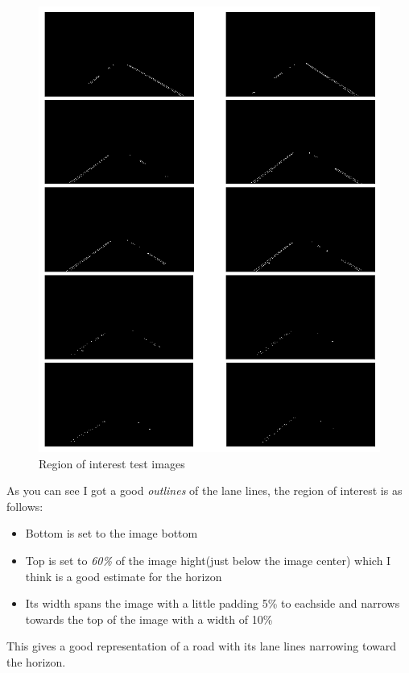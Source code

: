 \documentclass[11pt]{article}
\makeatletter
\def\maxwidth{\ifdim\Gin@nat@width>\linewidth\linewidth
    \else\Gin@nat@width\fi}
\let\Oldincludegraphics\includegraphics
\renewcommand{\includegraphics}[1]{\Oldincludegraphics[width=.8\maxwidth]{#1}}
\providecommand{\tightlist}{%
      \setlength{\itemsep}{0pt}\setlength{\parskip}{0pt}}
\makeatother
\begin{document}
\begin{figure}
\centering
\includegraphics{test_images_output/regionofinterest_test_images.png}
\caption{Region of interest test images}
\end{figure}

As you can see I got a good \emph{outlines} of the lane lines, the
region of interest is as follows:

\begin{itemize}
\tightlist
\item
  Bottom is set to the image bottom
\item
  Top is set to \emph{60\%} of the image hight(just below the image
  center) which I think is a good estimate for the horizon
\item
  Its width spans the image with a little padding 5\% to eachside and
  narrows towards the top of the image with a width of 10\%
\end{itemize}

This gives a good representation of a road with its lane lines narrowing
toward the horizon.
\end{document}
